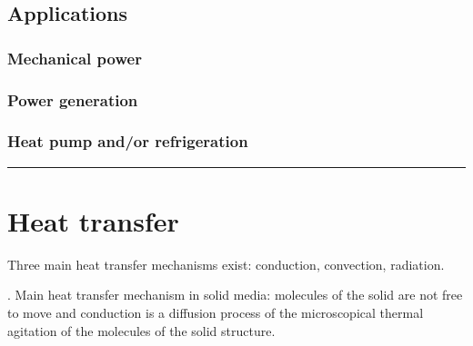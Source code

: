 \documentclass[letterpaper,10pt,english]{jupyterBook}
\begin{document}
\sphinxAtStartPar
{}

\sphinxAtStartPar
{}


\section{Applications}
\label{\detokenize{ch/heat-engines:applications}}\label{\detokenize{ch/heat-engines:classical-thermodynamics-heat-engines-systems}}

\subsection{Mechanical power}
\label{\detokenize{ch/heat-engines:mechanical-power}}\label{\detokenize{ch/heat-engines:classical-thermodynamics-heat-engines-systems-engine}}

\subsection{Power generation}
\label{\detokenize{ch/heat-engines:power-generation}}\label{\detokenize{ch/heat-engines:classical-thermodynamics-heat-engines-systems-power-generation}}

\subsection{Heat pump and/or refrigeration}
\label{\detokenize{ch/heat-engines:heat-pump-and-or-refrigeration}}\label{\detokenize{ch/heat-engines:classical-thermodynamics-heat-engines-systems-heat-pump-refrigeration}}



\bigskip\hrule\bigskip


\sphinxstepscope




\chapter{Heat transfer}
\label{\detokenize{ch/heat-transfer:heat-transfer}}\label{\detokenize{ch/heat-transfer:classical-thermodynamics-heat-transmission}}\label{\detokenize{ch/heat-transfer::doc}}
\sphinxAtStartPar
Three main heat transfer mechanisms exist: conduction, convection, radiation.

\sphinxAtStartPar
{\hyperref[\detokenize{ch/heat-transfer-conduction:classical-thermodynamics-heat-transmission-conduction}]{}}. Main heat transfer mechanism in solid media: molecules of the solid are not free to move and conduction is a diffusion process of the microscopical thermal agitation of the molecules of the solid structure.
\end{document}
